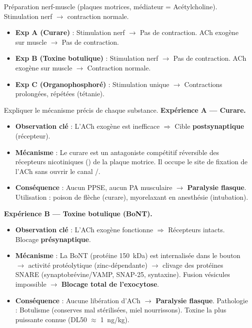 \documentclass[11pt]{article}
\newcommand{\cle}[1]{{\popxbold\color{popdark}#1}}
\begin{document}
\begin{exoresolu}
Préparation nerf-muscle (plaques motrices, médiateur = Acétylcholine). Stimulation nerf $\rightarrow$ contraction normale.
\begin{itemize}
\item \textbf{Exp A (Curare)} : Stimulation nerf $\rightarrow$ Pas de contraction. ACh exogène sur muscle $\rightarrow$ Pas de contraction.
\item \textbf{Exp B (Toxine botulique)} : Stimulation nerf $\rightarrow$ Pas de contraction. ACh exogène sur muscle $\rightarrow$ Contraction normale.
\item \textbf{Exp C (Organophosphoré)} : Stimulation unique $\rightarrow$ Contractions prolongées, répétées (tétanie).
\end{itemize}
Expliquer le mécanisme précis de chaque substance.
\tcblower
\textbf{Expérience A — Curare.}
\begin{itemize}
\item \textbf{Observation clé} : L'ACh exogène est inefficace $\Rightarrow$ Cible \textbf{postsynaptique} (récepteur).
\item \textbf{Mécanisme} : Le curare est un \cle{antagoniste compétitif réversible} des récepteurs nicotiniques () de la plaque motrice. Il occupe le site de fixation de l'ACh sans ouvrir le canal /.
\item \textbf{Conséquence} : Aucun PPSE, aucun PA musculaire $\rightarrow$ \textbf{Paralysie flasque}. Utilisation : poison de flèche (curare), myorelaxant en anesthésie (intubation).
\end{itemize}

\textbf{Expérience B — Toxine botulique (BoNT).}
\begin{itemize}
\item \textbf{Observation clé} : L'ACh exogène fonctionne $\Rightarrow$ Récepteurs intacts. Blocage \textbf{présynaptique}.
\item \textbf{Mécanisme} : La BoNT (protéine \SI{150}{kDa}) est internalisée dans le bouton $\rightarrow$ activité protéolytique (zinc-dépendante) $\rightarrow$ \cle{clivage des protéines SNARE} (synaptobrévine/VAMP, SNAP-25, syntaxine). Fusion vésicules impossible $\rightarrow$ \textbf{Blocage total de l'exocytose}.
\item \textbf{Conséquence} : Aucune libération d'ACh $\rightarrow$ \textbf{Paralysie flasque}. Pathologie : Botulisme (conserves mal stérilisées, miel nourrissons). Toxine la plus puissante connue (DL50 $\approx$ \SI{1}{ng/kg}).
\end{itemize}


\end{exoresolu}
\end{document}
